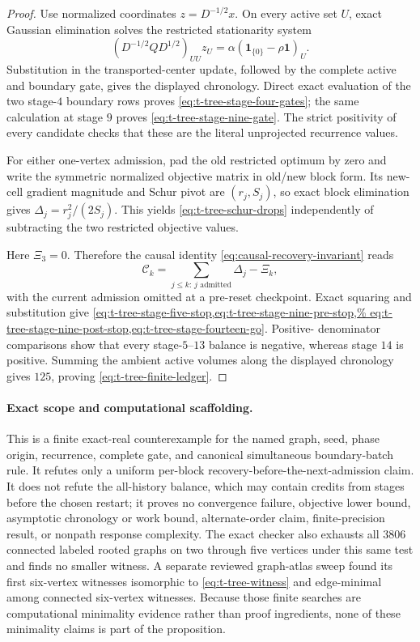 \begin{proof}
Use normalized coordinates $z=D^{-1/2}x$.  On every active set $U$, exact
Gaussian elimination solves the restricted stationarity system
\[
 \left(D^{-1/2}QD^{1/2}\right)_{UU}z_U
 =\alpha(\mathbf 1_{\{0\}}-\rho\mathbf 1)_U.
\]
Substitution in the transported-center update, followed by the complete
active and boundary gate, gives the displayed chronology.  Direct exact
evaluation of the two stage-$4$ boundary rows proves
\cref{eq:t-tree-stage-four-gates}; the same calculation at stage $9$ proves
\cref{eq:t-tree-stage-nine-gate}.  The strict positivity of every candidate
checks that these are the literal unprojected recurrence values.

For either one-vertex admission, pad the old restricted optimum by zero and
write the symmetric normalized objective matrix in old/new block form.  Its
new-cell gradient magnitude and Schur pivot are $(r_j,S_j)$, so exact block
elimination gives $\Delta_j=r_j^2/(2S_j)$.  This yields
\cref{eq:t-tree-schur-drops} independently of subtracting the two restricted
objective values.

Here $\Xi_3=0$.  Therefore the causal identity
\cref{eq:causal-recovery-invariant} reads
\[
 \mathcal C_k=\sum_{j\leq k:\,j\text{ admitted}}\Delta_j-\Xi_k,
\]
with the current admission omitted at a pre-reset checkpoint.  Exact squaring
and substitution give
\cref{eq:t-tree-stage-five-stop,eq:t-tree-stage-nine-pre-stop,%
eq:t-tree-stage-nine-post-stop,eq:t-tree-stage-fourteen-go}.  Positive-
denominator comparisons show that every stage-$5$--$13$ balance is negative,
whereas stage $14$ is positive.  Summing the ambient active volumes along the
displayed chronology gives $125$, proving
\cref{eq:t-tree-finite-ledger}.
\end{proof}

\paragraph{Exact scope and computational scaffolding.}
This is a finite exact-real counterexample for the named graph, seed, phase
origin, recurrence, complete gate, and canonical simultaneous boundary-batch
rule.  It refutes only a uniform per-block recovery-before-the-next-admission
claim.  It does not refute the all-history balance, which may contain credits
from stages before the chosen restart; it proves no convergence failure,
objective lower bound, asymptotic chronology or work bound, alternate-order
claim, finite-precision result, or nonpath response complexity.  The exact
checker also exhausts all $3806$ connected labeled rooted graphs on two
through five vertices under this same test and finds no smaller witness.  A
separate reviewed graph-atlas sweep found its first six-vertex witnesses
isomorphic to \cref{eq:t-tree-witness} and edge-minimal among connected
six-vertex witnesses.  Because those finite searches are computational
minimality evidence rather than proof ingredients, none of these minimality
claims is part of the proposition.

